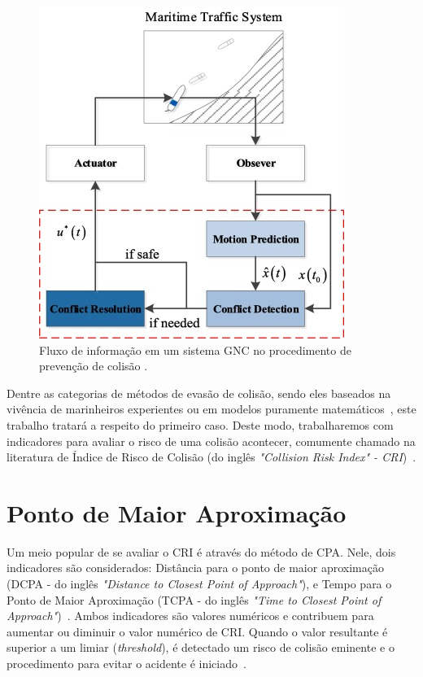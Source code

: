        \begin{figure}[H]
            \centering
            \includegraphics{fig/chap2/information_flow.png}
            \caption{Fluxo de informação em um sistema GNC no procedimento de prevenção de colisão \cite{HUANG2020451}.}
            \label{fig:Huang2020_collisionAvoidanceProcess}
        \end{figure}
        
        Dentre as categorias de métodos de evasão de colisão, sendo eles baseados na vivência de marinheiros experientes ou em modelos puramente matemáticos~\cite{HUANG2020451}, este trabalho tratará a respeito do primeiro caso. Deste modo, trabalharemos com indicadores para avaliar o risco de uma colisão acontecer, comumente chamado na literatura de Índice de Risco de Colisão (do inglês \textit{"Collision Risk Index" - CRI})~\cite{HUANG2019142}.
        
    \section{Ponto de Maior Aproximação}\label{subchap2:cpa}
        Um meio popular de se avaliar o CRI é através do método de CPA. Nele, dois indicadores são considerados: Distância para o ponto de maior aproximação (DCPA - do inglês \textit{"Distance to Closest Point of Approach"}), e Tempo para o Ponto de Maior Aproximação (TCPA - do inglês \textit{"Time to Closest Point of Approach"})~\cite{HUANG2019142}. Ambos indicadores são valores numéricos e contribuem para aumentar ou diminuir o valor numérico de CRI. Quando o valor resultante é superior a um limiar (\textit{threshold}), é detectado um risco de colisão eminente e o procedimento para evitar o acidente é iniciado~\cite{HUANG2020451}. 
        
